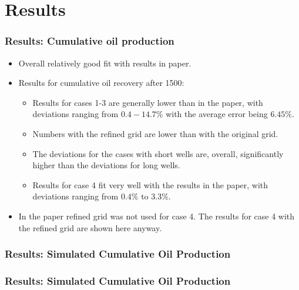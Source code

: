 \section{Results}

\begin{frame}
    \frametitle{Results: Cumulative oil production}
    \begin{itemize}
        \item Overall relatively good fit with results in paper.
        \pause
        \item Results for cumulative oil recovery after 1500:
        \begin{itemize}
             \item Results for cases 1-3 are generally lower than in the paper, with deviations ranging from $0.4-14.7\%$ with the average error being $6.45\%$. 
            \pause
             \item Numbers with the refined grid are lower than with the original grid. 
            \pause
             \item The deviations for the cases with short wells are, overall, significantly higher than the deviations for long wells.
            \pause
             \item Results for case 4 fit very well with the results in the paper, with deviations ranging from $0.4\%$ to $3.3\%$.
         \end{itemize} 
        \pause
        \item In the paper refined grid was not used for case 4. The results for case 4 with the refined grid are shown here anyway.
    \end{itemize}
\end{frame}


\begin{frame}
    \frametitle{Results: Simulated Cumulative Oil Production}
    \footnotesize
    \centerline{}
\end{frame}


\begin{frame}
    \frametitle{Results: Simulated Cumulative Oil Production}
    \footnotesize
    \centerline{}
\end{frame}



